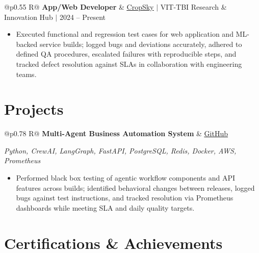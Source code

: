 \documentclass[a4paper,10pt]{article}
\newcommand{\ulink}[2]{\href{#1}{\uline{#2}}}
\newcommand{\subheading}[1]{{\color[HTML]{0A0A0A}\fontsize{12}{14}\selectfont\bfseries #1}}
\newcommand{\techstack}[1]{{\color[HTML]{5C5C5C}\fontsize{10.5}{12.5}\selectfont\itshape #1}}
\newcommand{\meta}[1]{{\color[HTML]{5C5C5C}\fontsize{10.5}{12.5}\selectfont #1}}
\begin{document}
\vspace{2pt}

\begin{tabularx}{\linewidth}{@{}p{0.55\linewidth} R@{}}
\subheading{App/Web Developer} & \meta{\ulink{https://sites.google.com/view/cropsky/home}{CropSky} $|$ VIT-TBI Research \& Innovation Hub $|$ 2024 -- Present}
\end{tabularx}
\begin{itemize}[nosep, leftmargin=1.5em, itemsep=1pt, topsep=2pt]
  \item {\color[HTML]{0A0A0A}\fontsize{11}{14}\selectfont Executed functional and regression test cases for web application and ML-backed service builds; logged bugs and deviations accurately, adhered to defined QA procedures, escalated failures with reproducible steps, and tracked defect resolution against SLAs in collaboration with engineering teams.}
\end{itemize}

\vspace{2pt}

\section{Projects}
\vspace{2pt}
\begin{tabularx}{\linewidth}{@{}p{0.78\linewidth} R@{}}
\subheading{Multi-Agent Business Automation System} & \meta{\ulink{https://github.com/su-jin1425/Multi-Agent-Business-Automation}{GitHub}}
\end{tabularx}
\vspace{1pt}
\techstack{Python, CrewAI, LangGraph, FastAPI, PostgreSQL, Redis, Docker, AWS, Prometheus}
\begin{itemize}[nosep, leftmargin=1.5em, itemsep=1pt, topsep=2pt]
  \item {\color[HTML]{0A0A0A}\fontsize{11}{14}\selectfont Performed black box testing of agentic workflow components and API features across builds; identified behavioral changes between releases, logged bugs against test instructions, and tracked resolution via Prometheus dashboards while meeting SLA and daily quality targets.}
\end{itemize}

\vspace{2pt}

\section{Certifications \& Achievements}
\vspace{2pt}
\end{document}
